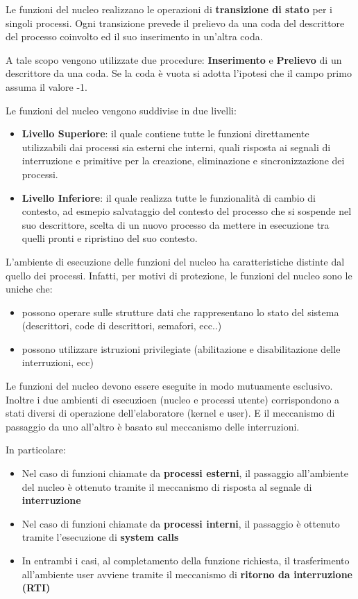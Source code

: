 \documentclass{article}
\begin{document}
Le funzioni del nucleo realizzano le operazioni di \textbf{transizione di stato} per i singoli processi. Ogni transizione prevede il
prelievo da una coda del descrittore del processo coinvolto ed il suo inserimento in un'altra coda.

A tale scopo vengono utilizzate due procedure: \textbf{Inserimento} e \textbf{Prelievo} di un descrittore da una coda. Se la coda è vuota
si adotta l'ipotesi che il campo primo assuma il valore -1.

\vspace{3mm}
Le funzioni del nucleo vengono suddivise in due livelli:
\begin{itemize}
    \item \textbf{Livello Superiore}: il quale contiene tutte le funzioni direttamente utilizzabili dai processi sia esterni che interni,
    quali risposta ai segnali di interruzione e primitive per la creazione, eliminazione e sincronizzazione dei processi.
    \item \textbf{Livello Inferiore}: il quale realizza tutte le funzionalità di cambio di contesto, ad esmepio salvataggio del contesto
    del processo che si sospende nel suo descrittore, scelta di un nuovo processo da mettere in esecuzione tra quelli pronti e 
    ripristino del suo contesto.
\end{itemize}

\vspace{3mm}
L'ambiente di esecuzione delle funzioni del nucleo ha caratteristiche distinte dal quello dei processi. Infatti, per motivi di protezione,
le funzioni del nucleo sono le uniche che:
\begin{itemize}
    \item possono operare sulle strutture dati che rappresentano lo stato del sistema (descrittori, code di descrittori, semafori, ecc..)
    \item possono utilizzare istruzioni privilegiate (abilitazione e disabilitazione delle interruzioni, ecc)
\end{itemize}

Le funzioni del nucleo devono essere eseguite in modo mutuamente esclusivo. Inoltre i due ambienti di esecuzioen (nucleo e processi
utente) corrispondono a stati diversi di operazione dell'elaboratore (kernel e user). E il meccanismo di passaggio da uno all'altro
è basato sul meccanismo delle interruzioni.

In particolare:
\begin{itemize}
    \item Nel caso di funzioni chiamate da \textbf{processi esterni}, il passaggio all'ambiente del nucleo è ottenuto tramite il meccanismo di
    risposta al segnale di \textbf{interruzione}
    \item Nel caso di funzioni chiamate da \textbf{processi interni}, il passaggio è ottenuto tramite l'esecuzione di \textbf{system calls}
    \item In entrambi i casi, al completamento della funzione richiesta, il trasferimento all'ambiente user avviene tramite il
    meccanismo di \textbf{ritorno da interruzione (RTI)}
\end{itemize}
\end{document}
